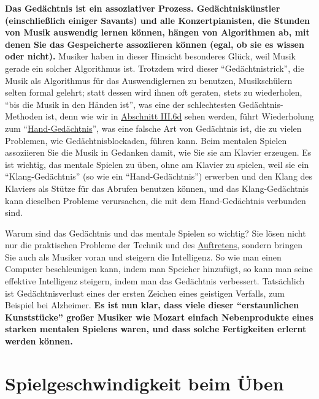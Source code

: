 \textbf{Das Gedächtnis ist ein assoziativer Prozess.
Gedächtniskünstler (einschließlich einiger Savants) und alle Konzertpianisten, die Stunden von Musik auswendig lernen können, hängen von Algorithmen ab, mit denen Sie das Gespeicherte assoziieren können (egal, ob sie es wissen oder nicht).}
Musiker haben in dieser Hinsicht besonderes Glück, weil Musik gerade ein solcher Algorithmus ist.
Trotzdem wird dieser \enquote{Gedächtnistrick}, die Musik als Algorithmus für das Auswendiglernen zu benutzen, Musikschülern selten formal gelehrt; statt dessen wird ihnen oft geraten, stets zu wiederholen, \enquote{bis die Musik in den Händen ist}, was eine der schlechtesten Gedächtnis-Methoden ist, denn wie wir in \hyperlink{c1iii6d}{Abschnitt III.6d} sehen werden, führt Wiederholung zum \enquote{\hyperlink{c1iii6d}{Hand-Gedächtnis}}, was eine falsche Art von Gedächtnis ist, die zu vielen Problemen, wie Gedächtnisblockaden, führen kann.
Beim mentalen Spielen assoziieren Sie die Musik in Gedanken damit, wie Sie sie am Klavier erzeugen.
Es ist wichtig, das mentale Spielen zu üben, ohne am Klavier zu spielen, weil sie ein \enquote{Klang-Gedächtnis} (so wie ein \enquote{Hand-Gedächtnis}) erwerben und den Klang des Klaviers als Stütze für das Abrufen benutzen können, und das Klang-Gedächtnis kann dieselben Probleme verursachen, die mit dem Hand-Gedächtnis verbunden sind.

Warum sind das Gedächtnis und das mentale Spielen so wichtig?
Sie lösen nicht nur die praktischen Probleme der Technik und des \hyperlink{c1iii14}{Auftretens}, sondern bringen Sie auch als Musiker voran und steigern die Intelligenz.
So wie man einen Computer beschleunigen kann, indem man Speicher hinzufügt, so kann man seine effektive Intelligenz steigern, indem man das Gedächtnis verbessert.
Tatsächlich ist Gedächtnisverlust eines der ersten Zeichen eines geistigen Verfalls, zum Beispiel bei Alzheimer.
\textbf{Es ist nun klar, dass viele dieser \enquote{erstaunlichen Kunststücke} großer Musiker wie Mozart einfach Nebenprodukte eines starken mentalen Spielens waren, und dass solche Fertigkeiten erlernt werden können.}


\section{Spielgeschwindigkeit beim Üben}\hypertarget{c1ii13}{}

